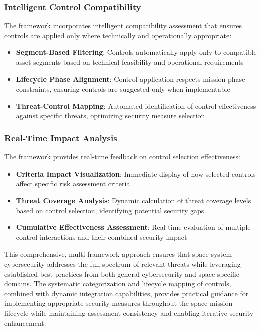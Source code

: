 \documentclass[binding=0.6cm]{sapthesis}
\begin{document}
\subsubsection{Intelligent Control Compatibility}

The framework incorporates intelligent compatibility assessment that ensures controls are applied only where technically and operationally appropriate:

\begin{itemize}
    \item \textbf{Segment-Based Filtering}: Controls automatically apply only to compatible asset segments based on technical feasibility and operational requirements
    \item \textbf{Lifecycle Phase Alignment}: Control application respects mission phase constraints, ensuring controls are suggested only when implementable
    \item \textbf{Threat-Control Mapping}: Automated identification of control effectiveness against specific threats, optimizing security measure selection
\end{itemize}

\subsubsection{Real-Time Impact Analysis}

The framework provides real-time feedback on control selection effectiveness:

\begin{itemize}
    \item \textbf{Criteria Impact Visualization}: Immediate display of how selected controls affect specific risk assessment criteria
    \item \textbf{Threat Coverage Analysis}: Dynamic calculation of threat coverage levels based on control selection, identifying potential security gaps
    \item \textbf{Cumulative Effectiveness Assessment}: Real-time evaluation of multiple control interactions and their combined security impact
\end{itemize}

This comprehensive, multi-framework approach ensures that space system cybersecurity addresses the full spectrum of relevant threats while leveraging established best practices from both general cybersecurity and space-specific domains. The systematic categorization and lifecycle mapping of controls, combined with dynamic integration capabilities, provides practical guidance for implementing appropriate security measures throughout the space mission lifecycle while maintaining assessment consistency and enabling iterative security enhancement.
\end{document}
